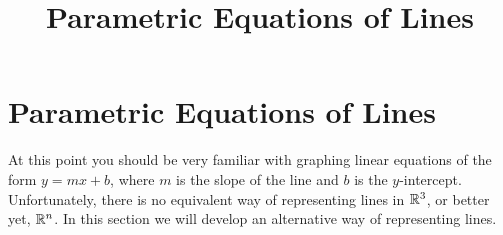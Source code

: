 \documentclass{ximera}
\title{Parametric Equations of Lines} \license{CC BY-NC-SA 4.0}
\begin{document}
\begin{abstract}
  \end{abstract}
\maketitle

\section*{Parametric Equations of Lines}

At this point you should be very familiar with graphing linear equations of the form $y=mx+b$, where $m$ is the slope of the line and $b$ is the $y$-intercept.  Unfortunately, there is no equivalent way of representing lines in $\mathbb{R}^3$, or better yet, $\mathbb{R}^n$.  In this section we will develop an alternative way of representing lines.
\end{document}
